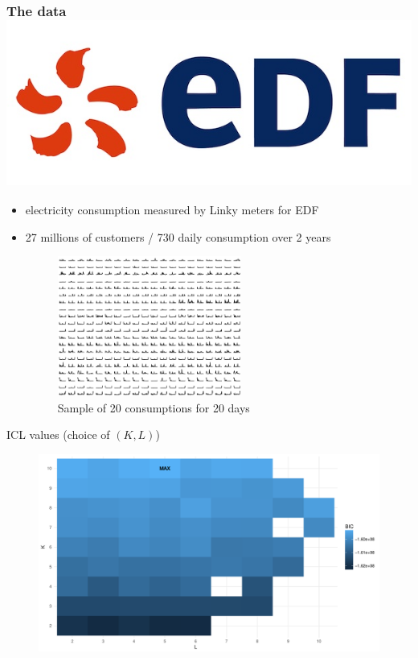 \documentclass[10pt]{beamer}
\def\relief#1{{\color{blue} {#1}}}
\begin{document}
\begin{frame}
\frametitle{The data \hspace{7cm} \includegraphics[height=.7cm,angle=0]{images/EDF.jpg}}
\begin{itemize}
\item \relief{electricity consumption} measured by Linky meters for EDF
\item \relief{27 millions} of customers / \relief{730 daily} consumption over 2 years
\begin{figure}
\includegraphics[width=6cm]{images/dataEDF.pdf}
\caption{Sample of 20 consumptions for 20 days}
\end{figure}
\end{itemize}
\end{frame}

\begin{frame}{ICL values (choice of $(K,L)$)}
\begin{figure}
\begin{centering}
\includegraphics[width=0.9\columnwidth]{images/graph-bic-heatmap.pdf}
\par\end{centering}
\end{figure}
\end{frame}
\end{document}
